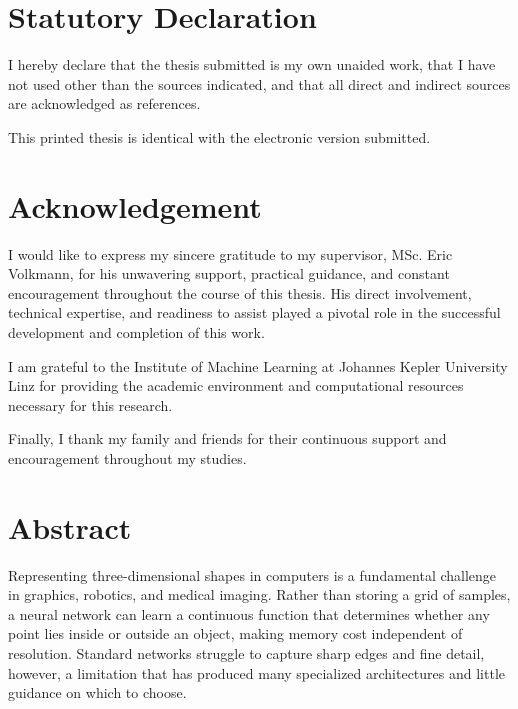 
\chapter*{Statutory Declaration}

I hereby declare that the thesis submitted is my own unaided work, that I have not used other than the sources indicated, and that all direct and indirect sources are acknowledged as references.

This printed thesis is identical with the electronic version submitted.

\vspace{2cm}

\chapter*{Acknowledgement}

I would like to express my sincere gratitude to my supervisor, MSc. Eric Volkmann, for his unwavering support, practical guidance, and constant encouragement throughout the course of this thesis. His direct involvement, technical expertise, and readiness to assist played a pivotal role in the successful development and completion of this work.

I am grateful to the Institute of Machine Learning at Johannes Kepler University Linz for providing the academic environment and computational resources necessary for this research.


Finally, I thank my family and friends for their continuous support and encouragement throughout my studies.

\chapter*{Abstract}

Representing three-dimensional shapes in computers is a fundamental challenge in graphics, robotics, and medical imaging. Rather than storing a grid of samples, a neural network can learn a continuous function that determines whether any point lies inside or outside an object, making memory cost independent of resolution. Standard networks struggle to capture sharp edges and fine detail, however, a limitation that has produced many specialized architectures and little guidance on which to choose.

